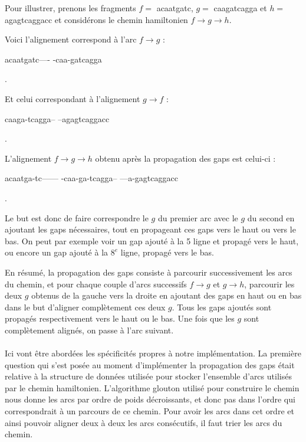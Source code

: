 \documentclass{article}
\begin{document}
Pour illustrer, prenons les fragments $f =$ acaatgatc, $g =$ caagatcagga et $h =$ agagtcaggacc et considérons le chemin hamiltonien $f \to g \to h$.

Voici l'alignement correspond à l'arc $f \to g$ :  
\begin{boxedverbatim}
acaatgatc----
-caa-gatcagga
\end{boxedverbatim}.

Et celui correspondant à l'alignement $g \to f$ :  
\begin{boxedverbatim}
caaga-tcagga--
--agagtcaggacc
\end{boxedverbatim}.

L'alignement $f \to g \to h$ obtenu après la propagation des gaps est celui-ci : 

\begin{boxedverbatim}
acaatga-tc------
-caa-ga-tcagga--
---a-gagtcaggacc
\end{boxedverbatim}.

Le but est donc de faire correspondre le $g$ du premier arc avec le $g$ du second en ajoutant les gaps nécessaires, tout en propageant ces gaps vers le haut ou vers le bas. On peut par exemple voir un gap ajouté à la 5 ligne et propagé vers le haut, ou encore un gap ajouté à la $8^e$ ligne, propagé vers le bas.

En résumé, la propagation des gaps consiste à parcourir successivement les arcs du chemin, et pour chaque couple d'arcs successifs
$f \to g$ et $g \to h$, parcourir les deux $g$ obtenus de la gauche vers la droite en ajoutant des gaps en haut ou en bas dans le but d'aligner complètement ces deux $g$. Tous les gaps ajoutés sont propagés respectivement vers le haut ou le bas. Une fois que les $g$ sont complètement alignés, on passe à l'arc suivant.
\\~\\


Ici vont être abordées les spécificités propres à notre implémentation. La première question qui s'est posée au moment d'implémenter la propagation des gaps était relative à la structure de données utilisée pour stocker l'ensemble d'arcs utilisés par le chemin hamiltonien. 
L'algorithme glouton utilisé pour construire le chemin nous donne les arcs par ordre de poids décroissants, et donc pas dans l'ordre qui correspondrait à un parcours de ce chemin. Pour avoir les arcs dans cet ordre et ainsi pouvoir aligner deux à deux les arcs consécutifs, il faut trier les arcs du chemin.
\end{document}
